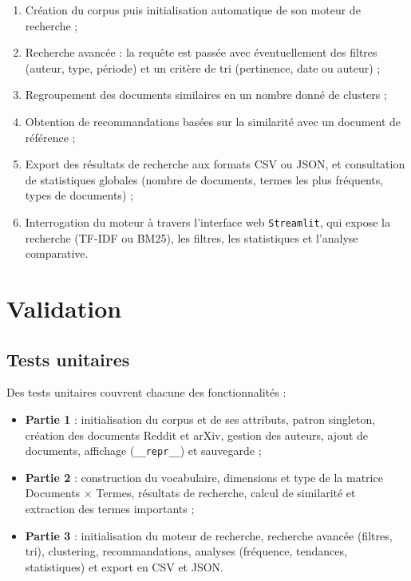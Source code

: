 \documentclass[12pt,a4paper]{article}
\begin{document}
\begin{enumerate}
    \item Création du corpus puis initialisation automatique de son moteur de recherche ;
    \item Recherche avancée : la requête est passée avec éventuellement des filtres (auteur, type, période) et un critère de tri (pertinence, date ou auteur) ;
    \item Regroupement des documents similaires en un nombre donné de clusters ;
    \item Obtention de recommandations basées sur la similarité avec un document de référence ;
    \item Export des résultats de recherche aux formats CSV ou JSON, et consultation de statistiques globales (nombre de documents, termes les plus fréquents, types de documents) ;
    \item Interrogation du moteur à travers l'interface web \texttt{Streamlit}, qui expose la recherche (TF-IDF ou BM25), les filtres, les statistiques et l'analyse comparative.
\end{enumerate}

\section{Validation}

\subsection{Tests unitaires}

Des tests unitaires couvrent chacune des fonctionnalités :

\begin{itemize}
    \item \textbf{Partie 1} : initialisation du corpus et de ses attributs, patron singleton, création des documents Reddit et arXiv, gestion des auteurs, ajout de documents, affichage (\texttt{\_\_repr\_\_}) et sauvegarde ;
    \item \textbf{Partie 2} : construction du vocabulaire, dimensions et type de la matrice Documents $\times$ Termes, résultats de recherche, calcul de similarité et extraction des termes importants ;
    \item \textbf{Partie 3} : initialisation du moteur de recherche, recherche avancée (filtres, tri), clustering, recommandations, analyses (fréquence, tendances, statistiques) et export en CSV et JSON.
\end{itemize}
\end{document}
